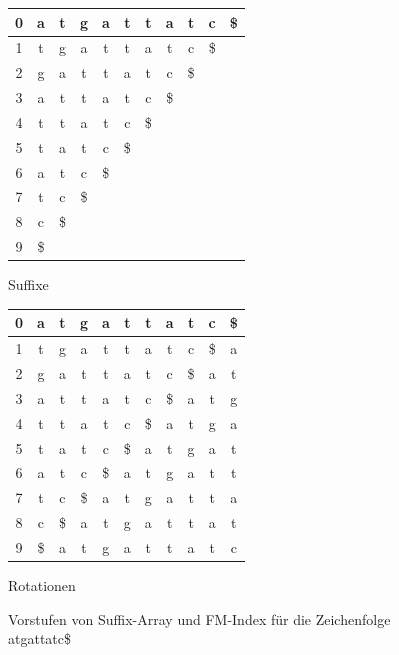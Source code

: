 \begin{figure}[h]
	\begin{center}
		\begin{tabular}{ c || c c c c c c c c c c | }
			\hline
			0 & a & t & g & a & t & t & a & t & c & \$ \\
			\hline
			1 & t & g & a & t & t & a & t & c & \$ &   \\
			\hline
			2 & g & a & t & t & a & t & c & \$ &   &   \\
			\hline
			3 & a & t & t & a & t & c & \$ &   &   &   \\
			\hline
			4 & t & t & a & t & c & \$ &   &   &   &   \\
			\hline
			5 & t & a & t & c & \$ &   &   &   &   &   \\
			\hline
			6 & a & t & c & \$ &   &   &   &   &   &   \\
			\hline
			7 & t & c & \$ &   &   &   &   &   &   &   \\
			\hline
			8 & c & \$ &   &   &   &   &   &   &   &   \\
			\hline
			9 & \$ &   &   &   &   &   &   &   &   &   \\
			\hline
		\end{tabular}
		\caption{Suffixe}%
		\label{tbl:suffixes}
	\end{center}
	\begin{center}
		\begin{tabular}{ c || c c c c c c c c c c | }
			\hline
			0 & a & t & g & a & t & t & a & t & c & \$ \\
			\hline
			1 & t & g & a & t & t & a & t & c & \$ & a \\
			\hline
			2 & g & a & t & t & a & t & c & \$ & a & t \\
			\hline
			3 & a & t & t & a & t & c & \$ & a & t & g \\
			\hline
			4 & t & t & a & t & c & \$ & a & t & g & a \\
			\hline
			5 & t & a & t & c & \$ & a & t & g & a & t \\
			\hline
			6 & a & t & c & \$ & a & t & g & a & t & t \\
			\hline
			7 & t & c & \$ & a & t & g & a & t & t & a \\
			\hline
			8 & c & \$ & a & t & g & a & t & t & a & t \\
			\hline
			9 & \$ & a & t & g & a & t & t & a & t & c \\
			\hline
		\end{tabular}
		\caption{Rotationen}%
		\label{tbl:rotations}
	\end{center}
	\caption{Vorstufen von Suffix-Array und FM-Index für die Zeichenfolge \glqq atgattatc\$\grqq}
	\label{fig:construction}
\end{figure}

